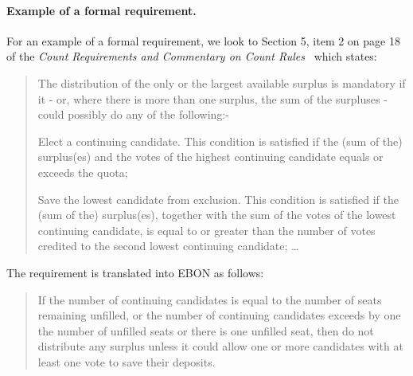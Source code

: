 \documentclass[letterpaper,twocolumn,10pt]{article}
\newcommand{\Votail}{Vot{\'a}il\xspace}
\begin{document}


\paragraph{Example of a formal requirement.}  
 
For an example of a formal requirement, we look to Section
 5, item 2 on page 18 of the \emph{Count Requirements and Commentary
   on Count Rules}~\cite{CEV00} which states:
 \begin{quote}
   The distribution of the only or the largest available surplus is mandatory if
   it - or, where there is more than one surplus, the sum of the surpluses - 
   could possibly do any of the following:-
   
   Elect a continuing candidate. This condition is satisfied if the (sum of the)
   surplus(es) and the votes of the highest continuing candidate equals or
   exceeds the quota;

   Save the lowest candidate from exclusion. This condition is satisfied if the
   (sum of the) surplus(es), together with the sum of the votes of the lowest
   continuing candidate, is equal to or greater than the number of votes
   credited to the second lowest continuing candidate; \ldots
 \end{quote}
 
 The requirement is translated into EBON as
 follows:
 \begin{quote}
   If the number of continuing candidates is equal
   to the number of seats remaining unfilled, or the
   number of continuing candidates exceeds by
   one the number of unfilled seats or there is one
   unfilled seat, then do not distribute any surplus
   unless it could allow one or more candidates
   with at least one vote to save their deposits.
 \end{quote}
 
\end{document}
